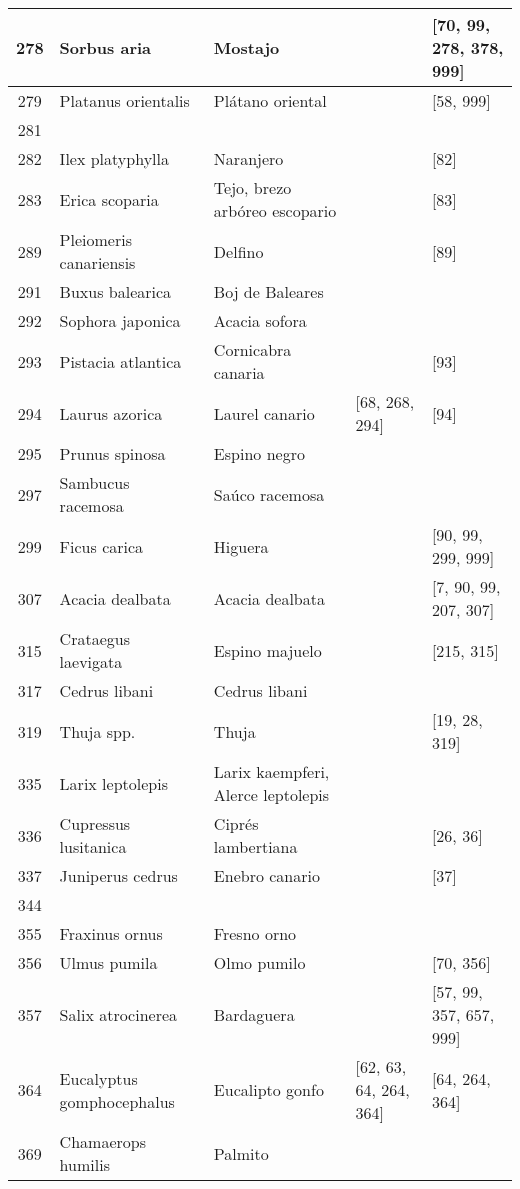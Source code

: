 \begin{landscape}
\begin{longtable}{|c|p{4cm}|p{4cm}|p{4cm}|p{4cm}|}
\hline
278 & Sorbus aria & Mostajo &  & [70, 99, 278, 378, 999] \\
\hline
279 & Platanus orientalis & Plátano oriental &  & [58, 999] \\
\hline
281 &  &  &  &  \\
\hline
282 & Ilex platyphylla & Naranjero &  & [82] \\
\hline
283 & Erica scoparia & Tejo, brezo arbóreo escopario &  & [83] \\
\hline
289 & Pleiomeris canariensis & Delfino &  & [89] \\
\hline
291 & Buxus balearica & Boj de Baleares &  &  \\
\hline
292 & Sophora japonica & Acacia sofora &  &  \\
\hline
293 & Pistacia atlantica & Cornicabra canaria &  & [93] \\
\hline
294 & Laurus azorica & Laurel canario & [68, 268, 294] & [94] \\
\hline
295 & Prunus spinosa & Espino negro &  &  \\
\hline
297 & Sambucus racemosa & Saúco racemosa &  &  \\
\hline
299 & Ficus carica & Higuera &  & [90, 99, 299, 999] \\
\hline
307 & Acacia dealbata & Acacia dealbata &  & [7, 90, 99, 207, 307] \\
\hline
315 & Crataegus laevigata & Espino majuelo &  & [215, 315] \\
\hline
317 & Cedrus libani & Cedrus libani &  &  \\
\hline
319 & Thuja spp. & Thuja &  & [19, 28, 319] \\
\hline
335 & Larix leptolepis & Larix kaempferi, Alerce leptolepis &  &  \\
\hline
336 & Cupressus lusitanica & Ciprés lambertiana &  & [26, 36] \\
\hline
337 & Juniperus cedrus & Enebro canario &  & [37] \\
\hline
344 &  &  &  &  \\
\hline
355 & Fraxinus ornus & Fresno orno &  &  \\
\hline
356 & Ulmus pumila & Olmo pumilo &  & [70, 356] \\
\hline
357 & Salix atrocinerea & Bardaguera &  & [57, 99, 357, 657, 999] \\
\hline
364 & Eucalyptus gomphocephalus & Eucalipto gonfo & [62, 63, 64, 264, 364] & [64, 264, 364] \\
\hline
369 & Chamaerops humilis & Palmito &  &  \\

\end{longtable}
\end{landscape}
